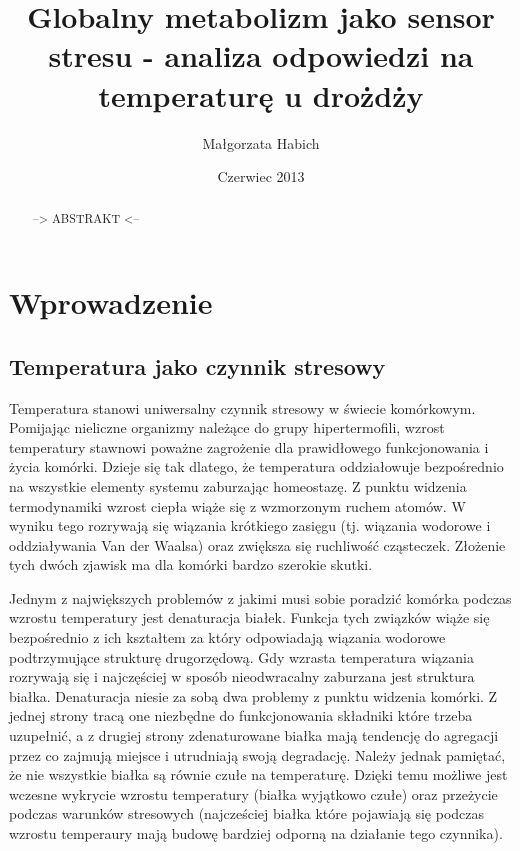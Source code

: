 \documentclass{pracamgr}
\author{Małgorzata Habich}
\title{Globalny metabolizm jako sensor stresu - analiza odpowiedzi na temperaturę u drożdży}
\date{Czerwiec 2013}
\begin{document}
\maketitle

\begin{abstract}
--> ABSTRAKT <--
\end{abstract}

\tableofcontents

\chapter{Wprowadzenie}

\section{Temperatura jako czynnik stresowy}

Temperatura stanowi uniwersalny czynnik stresowy w świecie komórkowym. Pomijając nieliczne organizmy należące do grupy hipertermofili, wzrost temperatury stawnowi poważne zagrożenie
dla prawidłowego funkcjonowania i życia komórki. Dzieje się tak dlatego, że temperatura oddziałowuje bezpośrednio na wszystkie elementy systemu zaburzając homeostazę. 
Z punktu widzenia termodynamiki wzrost ciepła wiąże się z wzmorzonym ruchem atomów. W wyniku tego rozrywają się wiązania krótkiego zasięgu (tj. wiązania wodorowe i oddziaływania Van der Waalsa) oraz 
zwiększa się ruchliwość cząsteczek. Złożenie tych dwóch zjawisk ma dla komórki bardzo szerokie skutki.

Jednym z największych problemów z jakimi musi sobie poradzić komórka podczas wzrostu temperatury jest denaturacja białek. Funkcja tych związków wiąże się bezpośrednio z ich kształtem za który odpowiadają 
wiązania wodorowe podtrzymujące strukturę drugorzędową. Gdy wzrasta temperatura wiązania rozrywają się i najczęściej w sposób nieodwracalny zaburzana jest struktura białka. Denaturacja niesie za sobą
dwa problemy z punktu widzenia komórki. Z jednej strony tracą one niezbędne do funkcjonowania składniki które trzeba uzupełnić, a z drugiej strony zdenaturowane białka mają tendencję
do agregacji przez co zajmują miejsce i utrudniają swoją degradację. Należy jednak pamiętać, że nie wszystkie białka są równie czułe na temperaturę. Dzięki temu możliwe jest wczesne wykrycie wzrostu temperatury (białka
wyjątkowo czułe) oraz przeżycie podczas warunków stresowych (najcześciej białka które pojawiają się podczas wzrostu temperaury mają budowę bardziej odporną na działanie tego czynnika)\cite{}.
\end{document}

